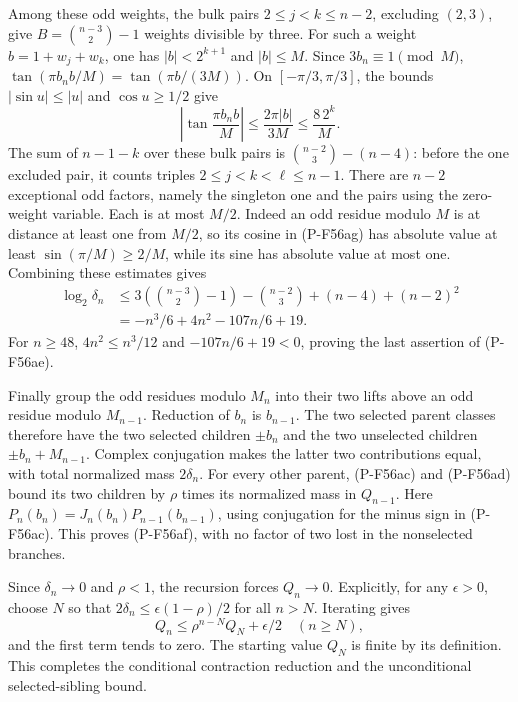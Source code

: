 \documentclass[11pt,a4paper]{article}
\begin{document}
Among these odd weights, the bulk pairs
$2\le j<k\le n-2$, excluding $(2,3)$,
give
$B=\binom{n-3}2-1$ weights divisible by three.
For such a weight $b=1+w_j+w_k$, one has
$|b|<2^{k+1}$ and $|b|\le M$.
Since $3b_n\equiv1\pmod M$,
$\tan(\pi b_n b/M)=\tan(\pi b/(3M))$.
On $[-\pi/3,\pi/3]$, the bounds
$|\sin u|\le|u|$ and $\cos u\ge1/2$ give
\[
 \left|\tan\frac{\pi b_n b}{M}\right|
       \le\frac{2\pi |b|}{3M}
       \le\frac{8\,2^k}{M}.
 \tag{P-F56ah}
\]
The sum of $n-1-k$ over these bulk pairs is
$\binom{n-2}3-(n-4)$: before the one excluded pair,
it counts triples $2\le j<k<\ell\le n-1$.
There are $n-2$ exceptional odd factors, namely the
singleton one and the pairs using the zero-weight
variable. Each is at most $M/2$.
Indeed an odd residue modulo $M$ is at distance at least
one from $M/2$, so its cosine in (P-F56ag) has absolute
value at least $\sin(\pi/M)\ge2/M$, while its sine has
absolute value at most one.
Combining these estimates gives
\[
 \begin{split}
 \log_2\delta_n
 &\le 3\left(\binom{n-3}2-1\right)
        -\binom{n-2}3+(n-4)+(n-2)^2\\
 &=-n^3/6+4n^2-107n/6+19 .
 \end{split}
 \tag{P-F56ai}
\]
For $n\ge48$, $4n^2\le n^3/12$ and
$-107n/6+19<0$, proving the last assertion of
(P-F56ae).

Finally group the odd residues modulo $M_n$ into their
two lifts above an odd residue modulo $M_{n-1}$.
Reduction of $b_n$ is $b_{n-1}$.
The two selected parent classes therefore have the two
selected children $\pm b_n$ and the two unselected
children $\pm b_n+M_{n-1}$.
Complex conjugation makes the latter two contributions
equal, with total normalized mass $2\delta_n$.
For every other parent, (P-F56ac) and (P-F56ad)
bound its two children by $\rho$ times its normalized
mass in $Q_{n-1}$.
Here
$P_n(b_n)=J_n(b_n)P_{n-1}(b_{n-1})$,
using conjugation for the minus sign in (P-F56ac).
This proves (P-F56af), with no factor of two lost
in the nonselected branches.

Since $\delta_n\to0$ and $\rho<1$, the recursion forces
$Q_n\to0$. Explicitly, for any $\epsilon>0$, choose
$N$ so that $2\delta_n\le\epsilon(1-\rho)/2$
for all $n>N$. Iterating gives
\[
 Q_n\le \rho^{n-N}Q_N+\epsilon/2
                  \quad(n\ge N),
 \tag{P-F56aj}
\]
and the first term tends to zero.
The starting value $Q_N$ is finite by its definition.
This completes the conditional contraction reduction
and the unconditional selected-sibling bound.
\end{document}

